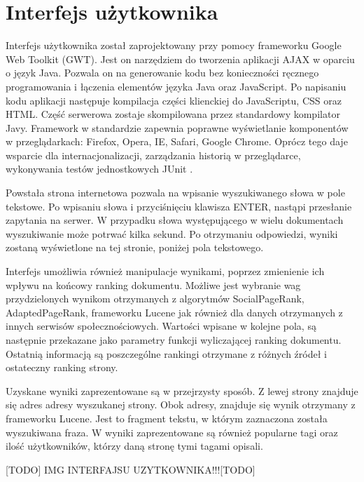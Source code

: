 \section{Interfejs użytkownika}

Interfejs użytkownika został zaprojektowany przy pomocy frameworku Google Web Toolkit (GWT).  Jest on narzędziem do tworzenia aplikacji AJAX w oparciu o język Java.  Pozwala on na generowanie kodu bez konieczności ręcznego programowania i łączenia elementów języka Java oraz JavaScript. Po napisaniu kodu aplikacji następuje kompilacja części klienckiej do JavaScriptu, CSS oraz HTML. Część serwerowa zostaje skompilowana przez standardowy kompilator Javy. Framework w standardzie zapewnia poprawne wyświetlanie komponentów w przeglądarkach: Firefox, Opera, IE, Safari, Google Chrome. Oprócz tego daje wsparcie dla internacjonalizacji, zarządzania historią w przeglądarce, wykonywania testów jednostkowych JUnit \cite{wikipedia:gwt} .

Powstała strona internetowa pozwala na wpisanie wyszukiwanego słowa w pole tekstowe. Po wpisaniu słowa i przyciśnięciu klawisza ENTER, nastąpi przesłanie zapytania na serwer. W przypadku słowa występującego w wielu dokumentach wyszukiwanie może potrwać kilka sekund. Po otrzymaniu odpowiedzi, wyniki zostaną wyświetlone na tej stronie, poniżej pola tekstowego. 

Interfejs umożliwia również manipulacje wynikami, poprzez zmienienie ich wpływu na końcowy ranking dokumentu. Możliwe jest wybranie wag przydzielonych wynikom otrzymanych z algorytmów SocialPageRank, AdaptedPageRank, frameworku Lucene jak również dla danych otrzymanych z innych serwisów społecznościowych. Wartości wpisane w kolejne pola, są następnie przekazane jako parametry funkcji wyliczającej ranking dokumentu. Ostatnią informacją są poszczególne rankingi otrzymane z różnych źródeł i ostateczny ranking strony. 


Uzyskane wyniki zaprezentowane są w przejrzysty sposób. Z lewej strony znajduje się adres adresy wyszukanej strony. Obok adresy, znajduje się wynik otrzymany z frameworku Lucene. Jest to fragment tekstu, w którym zaznaczona została wyszukiwana fraza. W wyniki zaprezentowane są również popularne tagi oraz ilość użytkowników, którzy daną stronę tymi tagami opisali. 


[TODO] IMG INTERFAJSU UZYTKOWNIKA!!![TODO]